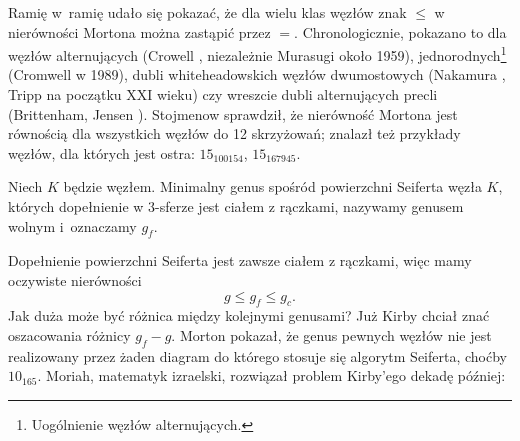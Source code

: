Ramię w~ramię udało się pokazać, że dla wielu klas węzłów znak $\le$ w nierówności Mortona można zastąpić przez $=$.
Chronologicznie, pokazano to dla węzłów alternujących (Crowell \cite{crowellrichard1959}, niezależnie Murasugi \cite{murasugi1958} około 1959),
%
%
%
jednorodnych\footnote{Uogólnienie węzłów alternujących.} (Cromwell \cite{cromwell1989} w 1989),
%
%
dubli whiteheadowskich węzłów dwumostowych (Nakamura \cite{nakamura2006}, Tripp \cite{tripp2002} na początku XXI wieku)
%
%
%
%
czy wreszcie dubli alternujących precli (Brittenham, Jensen \cite{brittenham2006}).
%
%
%
Stojmenow \cite{stoimenow2002} sprawdził, że nierówność Mortona jest równością dla wszystkich węzłów do 12 skrzyżowań; znalazł też przykłady węzłów, dla których jest ostra: $15_{100154}$, $15_{167945}$.
%

\begin{definition}
%
%
    Niech $K$ będzie węzłem.
    Minimalny genus spośród powierzchni Seiferta węzła $K$, których dopełnienie w 3-sferze jest ciałem z rączkami, nazywamy genusem wolnym i~oznaczamy $g_f$.
\end{definition}

Dopełnienie powierzchni Seiferta jest zawsze ciałem z rączkami, więc mamy oczywiste nierówności
\begin{equation}
    g \le g_f \le g_c.
\end{equation}
Jak duża może być różnica między kolejnymi genusami?
Już Kirby \cite[problem 1.20a]{kirby1978} chciał znać oszacowania różnicy $g_f - g$.
Morton \cite{morton1986} pokazał, że genus pewnych węzłów nie jest realizowany przez żaden diagram do którego stosuje się algorytm Seiferta, choćby $10_{165}$.
%
Moriah, matematyk izraelski, rozwiązał problem Kirby'ego dekadę później:
%

